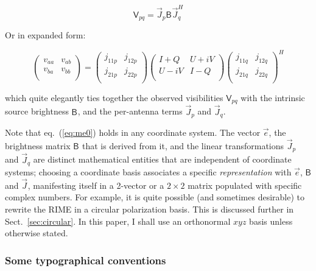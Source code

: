 \documentclass[]{aa}
\newcommand{\herm}{H}
\newcommand{\jones}[2]{\vec {#1}_{#2}}
\newcommand{\jonesT}[2]{\vec {#1}^{\herm}_{#2}}
\newcommand{\coh}[2]{\mathsf{{#1}}_{{#2}}}
\begin{document}
    \begin{equation}\label{eq:me0}
    \coh{V}{pq} = \jones{J}{p} \coh{B}{}  \jonesT{J}{q}
    \end{equation}

Or in expanded form:

\[
    \left( 
    \begin{array}{cc}
    v_{aa} & v_{ab} \\
    v_{ba} & v_{bb} \\
    \end{array}
    \right) = 
    \left( 
    \begin{array}{cc}
    j_{11p} & j_{12p} \\
    j_{21p} & j_{22p} \\
    \end{array}
    \right) 
    \left( 
    \begin{array}{cc}
    I+Q & U+iV \\
    U-iV & I-Q \\
    \end{array}
    \right) 
    \left( 
    \begin{array}{cc}
    j_{11q} & j_{12q} \\
    j_{21q} & j_{22q} \\
    \end{array}
    \right)^\herm
\]

which quite elegantly ties together the observed visibilities $\coh{V}{pq}$ with the intrinsic source brightness $\coh{B}{}$, and the per-antenna terms $\jones{J}{p}$ and $\jones{J}{q}$.

Note that eq.~(\ref{eq:me0}) holds in any coordinate system. The vector $\vec e$, the brightness matrix $\coh{B}{}$ that is derived from it, and the linear transformations $\jones{J}{p}$ and $\jones{J}{q}$ are distinct mathematical entities that are independent of coordinate systems; choosing a coordinate basis associates a specific {\em representation} with $\vec e$,  $\coh{B}{}$ and $\jones{J}{}$, manifesting itself in a 2-vector or a $2\times2$ matrix populated with specific complex numbers. For example, it is quite possible (and sometimes desirable) to rewrite the RIME in a circular polarization basis. This is discussed further in Sect.~\ref{sec:circular}. In this paper, I shall use an orthonormal $xyz$ basis unless otherwise stated.

\subsubsection{Some typographical conventions}
\end{document}
